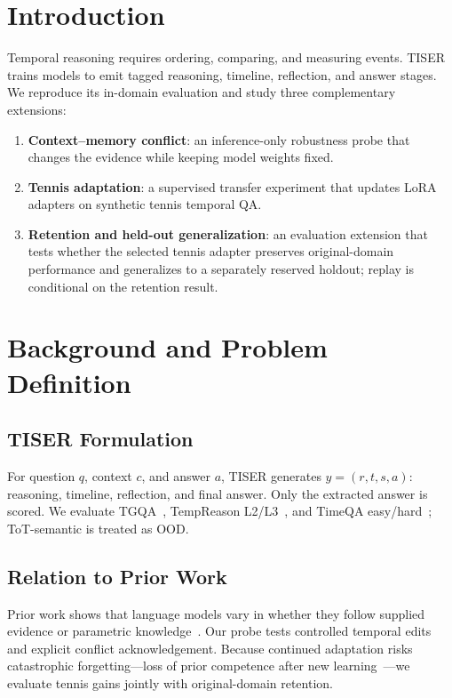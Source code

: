 \documentclass[conference]{IEEEtran}
\begin{document}
\section{Introduction}

Temporal reasoning requires ordering, comparing, and measuring events. TISER~\cite{bazaga2025tiser} trains models to emit tagged reasoning, timeline, reflection, and answer stages. We reproduce its in-domain evaluation and study three complementary extensions:
\begin{enumerate}
\item \textbf{Context--memory conflict}: an inference-only robustness probe that changes the evidence while keeping model weights fixed.
\item \textbf{Tennis adaptation}: a supervised transfer experiment that updates LoRA adapters on synthetic tennis temporal QA.
\item \textbf{Retention and held-out generalization}: an evaluation extension that tests whether the selected tennis adapter preserves original-domain performance and generalizes to a separately reserved holdout; replay is conditional on the retention result.
\end{enumerate}

\section{Background and Problem Definition}

\subsection{TISER Formulation}

For question $q$, context $c$, and answer $a$, TISER generates $y=(r,t,s,a)$: reasoning, timeline, reflection, and final answer. Only the extracted answer is scored. We evaluate TGQA~\cite{xiong2024tgqa}, TempReason L2/L3~\cite{tan2023tempreason}, and TimeQA easy/hard~\cite{chen2021timeqa}; ToT-semantic is treated as OOD.

\subsection{Relation to Prior Work}

Prior work shows that language models vary in whether they follow supplied evidence or parametric knowledge~\cite{xie2024conflict}. Our probe tests controlled temporal edits and explicit conflict acknowledgement. Because continued adaptation risks catastrophic forgetting---loss of prior competence after new learning~\cite{kirkpatrick2017forgetting}---we evaluate tennis gains jointly with original-domain retention.
\end{document}
